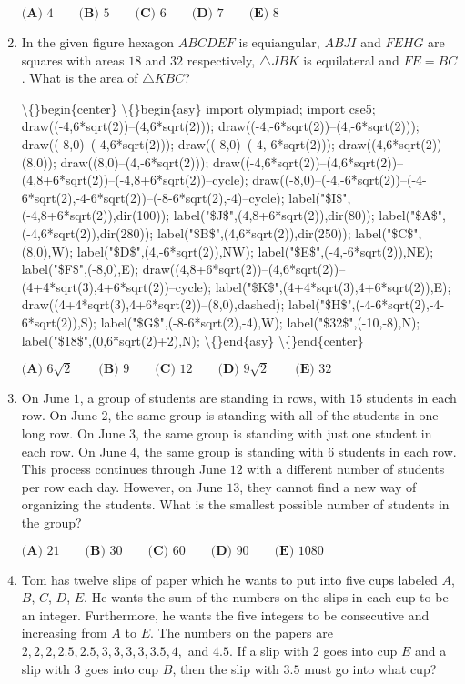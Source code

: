 \documentclass{article}
\begin{document}
\begin{enumerate}[label=\arabic*., itemsep=0.5em]
\(\textbf{(A) } 4 \qquad \textbf{(B) } 5 \qquad \textbf{(C) } 6 \qquad \textbf{(D) } 7 \qquad \textbf{(E) } 8\)\par \vspace{0.5em}\item In the given figure hexagon \(ABCDEF\) is equiangular, \(ABJI\) and \(FEHG\) are squares with areas \(18\) and \(32\) respectively, \(\triangle JBK\) is equilateral and \(FE=BC\). What is the area of \(\triangle KBC\)?


\textbackslash\{\}begin\{center\}
\textbackslash\{\}begin\{asy\}
import olympiad;
import cse5;
draw((-4,6*sqrt(2))--(4,6*sqrt(2)));
draw((-4,-6*sqrt(2))--(4,-6*sqrt(2)));
draw((-8,0)--(-4,6*sqrt(2)));
draw((-8,0)--(-4,-6*sqrt(2)));
draw((4,6*sqrt(2))--(8,0));
draw((8,0)--(4,-6*sqrt(2)));
draw((-4,6*sqrt(2))--(4,6*sqrt(2))--(4,8+6*sqrt(2))--(-4,8+6*sqrt(2))--cycle);
draw((-8,0)--(-4,-6*sqrt(2))--(-4-6*sqrt(2),-4-6*sqrt(2))--(-8-6*sqrt(2),-4)--cycle);
label("\$I\$",(-4,8+6*sqrt(2)),dir(100)); label("\$J\$",(4,8+6*sqrt(2)),dir(80));
label("\$A\$",(-4,6*sqrt(2)),dir(280)); label("\$B\$",(4,6*sqrt(2)),dir(250));
label("\$C\$",(8,0),W); label("\$D\$",(4,-6*sqrt(2)),NW); label("\$E\$",(-4,-6*sqrt(2)),NE); label("\$F\$",(-8,0),E);
draw((4,8+6*sqrt(2))--(4,6*sqrt(2))--(4+4*sqrt(3),4+6*sqrt(2))--cycle);
label("\$K\$",(4+4*sqrt(3),4+6*sqrt(2)),E);
draw((4+4*sqrt(3),4+6*sqrt(2))--(8,0),dashed);
label("\$H\$",(-4-6*sqrt(2),-4-6*sqrt(2)),S);
label("\$G\$",(-8-6*sqrt(2),-4),W);
label("\$32\$",(-10,-8),N);
label("\$18\$",(0,6*sqrt(2)+2),N);
\textbackslash\{\}end\{asy\}
\textbackslash\{\}end\{center\}


\(\textbf{(A) }6\sqrt{2}\qquad\textbf{(B) }9\qquad\textbf{(C) }12\qquad\textbf{(D) }9\sqrt{2}\qquad\textbf{(E) }32\)\par \vspace{0.5em}\item On June \(1\), a group of students are standing in rows, with \(15\) students in each row. On June \(2\), the same group is standing with all of the students in one long row. On June \(3\), the same group is standing with just one student in each row. On June \(4\), the same group is standing with \(6\) students in each row. This process continues through June \(12\) with a different number of students per row each day. However, on June \(13\), they cannot find a new way of organizing the students. What is the smallest possible number of students in the group?

\(\textbf{(A) } 21 \qquad \textbf{(B) } 30 \qquad \textbf{(C) } 60 \qquad \textbf{(D) } 90 \qquad \textbf{(E) } 1080\)\par \vspace{0.5em}\item Tom has twelve slips of paper which he wants to put into five cups labeled \(A\), \(B\), \(C\), \(D\), \(E\). He wants the sum of the numbers on the slips in each cup to be an integer. Furthermore, he wants the five integers to be consecutive and increasing from \(A\) to \(E\). The numbers on the papers are \(2, 2, 2, 2.5, 2.5, 3, 3, 3, 3, 3.5, 4,\) and \(4.5\). If a slip with \(2\) goes into cup \(E\) and a slip with \(3\) goes into cup \(B\), then the slip with \(3.5\) must go into what cup?


\end{enumerate}
\end{document}
